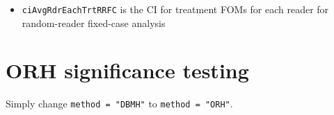 \documentclass[
]{book}
\newenvironment{Shaded}{\begin{snugshade}}{\end{snugshade}}
\newcommand{\CommentTok}[1]{\textcolor[rgb]{0.56,0.35,0.01}{\textit{#1}}}
\newcommand{\NormalTok}[1]{#1}
\newcommand{\OperatorTok}[1]{\textcolor[rgb]{0.81,0.36,0.00}{\textbf{#1}}}
\providecommand{\tightlist}{%
  \setlength{\itemsep}{0pt}\setlength{\parskip}{0pt}}
\begin{document}
\begin{itemize}
\tightlist
\item
  \texttt{ciAvgRdrEachTrtRRFC} is the CI for treatment FOMs for each reader for random-reader fixed-case analysis
\end{itemize}

\begin{Shaded}
\end{Shaded}

\hypertarget{orh-significance-testing}{%
\section{ORH significance testing}\label{orh-significance-testing}}

Simply change \texttt{method\ =\ "DBMH"} to \texttt{method\ =\ "ORH"}.
\end{document}
